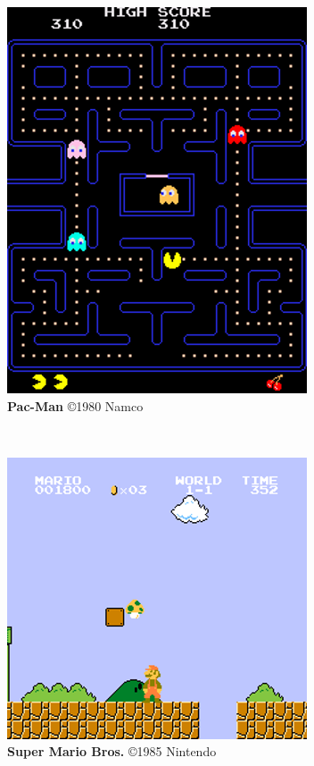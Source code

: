 \expandafter\documentclass\expandafter[table, usenames, svgnames, dvipsnames, \classopts]{beamer}
\begin{document}
\begin{frame}
\begin{figure}
	    \begin{subfigure}[!h]{0.25\paperwidth}
	    	\centering
	    	\includegraphics[draft,height=0.22\paperheight]{pacman-screenshot}
	        \caption{\scriptsize\textbf{Pac-Man} \copyright{1980} Namco\footnotemark{}}
	    \end{subfigure}
	    ~
		\begin{subfigure}[!h]{0.25\paperwidth}
			\centering
	        \includegraphics[draft,height=0.2\paperheight]{supermario-screenshot}
	        \caption{\scriptsize\textbf{Super Mario Bros.} \copyright{1985} Nintendo\footnotemark{}}
	    \end{subfigure}
	   	~
	    \begin{subfigure}[!h]{0.25\paperwidth}
	    	\centering

\end{subfigure}
\end{figure}
\end{frame}
\end{document}
